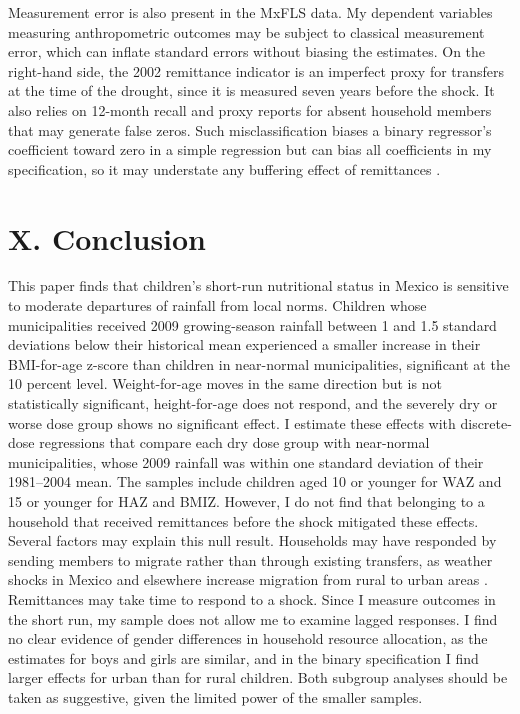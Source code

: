 \documentclass[12pt]{article}
\begin{document}
Measurement error is also present in the MxFLS data. My dependent variables measuring anthropometric outcomes may be subject to classical measurement error, which can inflate standard errors without biasing the estimates. On the right-hand side, the 2002 remittance indicator is an imperfect proxy for transfers at the time of the drought, since it is measured seven years before the shock. It also relies on 12-month recall and proxy reports for absent household members that may generate false zeros. Such misclassification biases a binary regressor's coefficient toward zero in a simple regression but can bias all coefficients in my specification, so it may understate any buffering effect of remittances \parencite{aignerRegressionBinaryIndependent1973}.

\section*{X. Conclusion}\label{sec:X}

This paper finds that children's short-run nutritional status in Mexico is sensitive to moderate departures of rainfall from local norms. Children whose municipalities received 2009 growing-season rainfall between 1 and 1.5 standard deviations below their historical mean experienced a smaller increase in their BMI-for-age z-score than children in near-normal municipalities, significant at the 10 percent level. Weight-for-age moves in the same direction but is not statistically significant, height-for-age does not respond, and the severely dry or worse dose group shows no significant effect. I estimate these effects with discrete-dose regressions that compare each dry dose group with near-normal municipalities, whose 2009 rainfall was within one standard deviation of their 1981--2004 mean. The samples include children aged 10 or younger for WAZ and 15 or younger for HAZ and BMIZ. However, I do not find that belonging to a household that received remittances before the shock mitigated these effects. Several factors may explain this null result. Households may have responded by sending members to migrate rather than through existing transfers, as weather shocks in Mexico and elsewhere increase migration from rural to urban areas \parencite{jessoeClimateChangeLabour2018,grogerInternalLaborMigration2016}. Remittances may take time to respond to a shock. Since I measure outcomes in the short run, my sample does not allow me to examine lagged responses. I find no clear evidence of gender differences in household resource allocation, as the estimates for boys and girls are similar, and in the binary specification I find larger effects for urban than for rural children. Both subgroup analyses should be taken as suggestive, given the limited power of the smaller samples.
\end{document}
